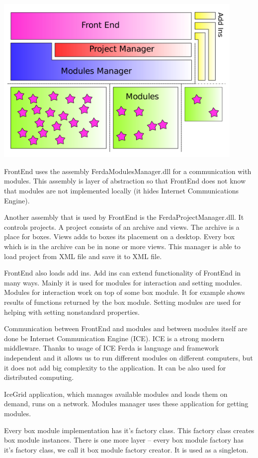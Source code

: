 \documentclass[a4paper,12pt]{book}
\begin{document}
\noindent\includegraphics[width=12cm]{designB}

FrontEnd uses the assembly FerdaModulesManager.dll for a communication with modules. This assembly is layer of abstraction so that FrontEnd does not know that modules are not implemented locally (it hides Internet Communications Engine).

Another assembly that is used by FrontEnd is the FerdaProjectManager.dll. It controls projects. A project consists of an archive and views. The archive is a place for boxes. Views adds to boxes its placement on a desktop. Every box which is in the archive can be in none or more views. This manager is able to load project from XML file and save it to XML file.

FrontEnd also loads add ins. Add ins can extend functionality of FrontEnd in many ways. Mainly it is used for modules for interaction and setting modules. Modules for interaction work on top of some box module. It for example shows results of functions returned by the box module. Setting modules are used for helping with setting nonstandard properties.

Communication between FrontEnd and modules and between modules itself are done be Internet Communication Engine (ICE). ICE is a strong modern middleware. Thanks to usage of ICE Ferda is language and framework independent and it allows us to run different modules on different computers, but it does not add big complexity to the application. It can be also used for distributed computing.

IceGrid application, which manages available modules and loads them on demand, runs on a network. Modules manager uses these application for getting modules.

Every box module implementation has it's factory class. This factory class creates box module instances. There is one more layer -- every box module factory has it's factory class, we call it box module factory creator. It is used as a singleton.
\end{document}
